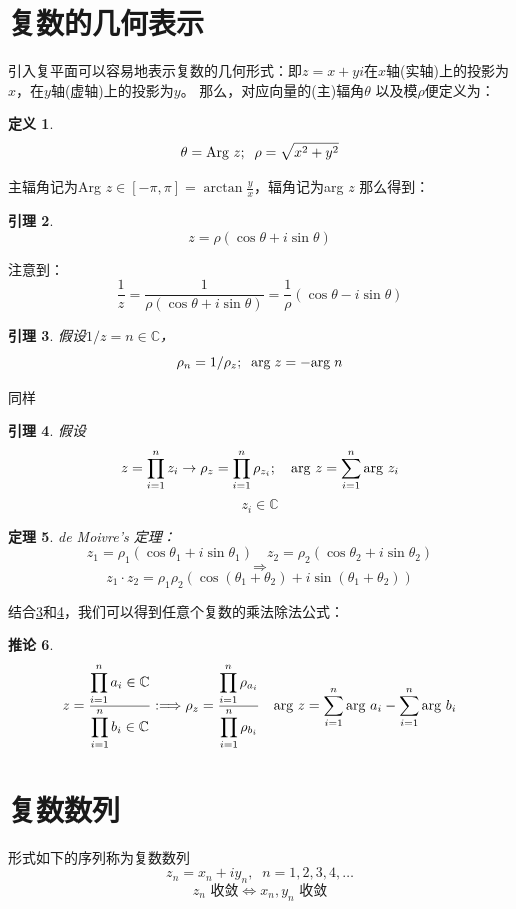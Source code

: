 \documentclass[10pt, a4paper, oneside]{ctexbook}
\newtheorem{theorem}{定理}[section]
\newtheorem{definition}[theorem]{定义}
\newtheorem{lemma}[theorem]{引理}
\newtheorem{corollary}[theorem]{推论}
\begin{document}
\section{复数的几何表示}
引入复平面可以容易地表示复数的几何形式：即$z=x+yi$在$x$轴(实轴)上的投影为$x$，在$y$轴(虚轴)上的投影为$y$。
那么，对应向量的(主)辐角$\theta$ 以及模$\rho$便定义为：
\begin{definition}
    $$\theta=\text{\rm Arg } z;\;\;\rho=\sqrt{x^2+y^2}$$
\end{definition}
主辐角记为Arg $\displaystyle z \in[-\pi,\pi] =\arctan \frac{y}{x}$，辐角记为arg $z$
那么得到：
\begin{lemma}
    \label{eularq}
    $$
        z = \rho(\cos \theta + i \sin \theta)
    $$
\end{lemma}
注意到：
$$
    \frac{1}{z}=\frac{1}{\rho(\cos \theta + i \sin \theta)}=\frac{1}{\rho}(\cos \theta - i \sin \theta)
$$
\begin{lemma}
    \label{le1}
    假设$1/z=n\in \mathbb{C}$，
    $$\rho_{n}=1/\rho_z;\;\; {\rm arg \;} z=-{\rm arg \;} n$$
\end{lemma}
同样
\begin{lemma}
    \label{le2}
    假设$$
        z=\prod_{i=1}^{n}z_i\to \rho_z=\prod_{i=1}^n \rho_{z_i};\quad \text{\rm arg }z=\sum_{i=1}^n \text{\rm arg }z_i
    $$
    $$z_i\in\mathbb{C}$$
\end{lemma}
\begin{theorem}
    de Moivre’s 定理：
    $$z_1=\rho_1(\cos\theta_1+i\sin \theta_1)\quad z_2=\rho_2(\cos\theta_2+i\sin \theta_2)$$
    $$\Rightarrow$$
    $$z_1\cdot z_2=\rho_1\rho_2(\cos(\theta_1+\theta_2)+i\sin(\theta_1+\theta_2))$$
\end{theorem}
结合\ref{le1}和\ref{le2}，我们可以得到任意个复数的乘法除法公式：
\begin{corollary}
    \begin{align*}
        z=\frac{\displaystyle\prod_{i=1}^n a_i \in \mathbb{C} }{\displaystyle\prod_{i=1}^n b_i \in \mathbb{C}}
        :\Longrightarrow \rho_z=\frac{\displaystyle\prod_{i=1}^n \rho_{a_i}}{\displaystyle\prod_{i=1}^n \rho_{b_i}} \quad \text{\rm arg }z =
        \sum_{i=1}^n \text{\rm arg }a_i - \sum_{i=1}^n \text{\rm arg }b_i
    \end{align*}
\end{corollary}
\section{复数数列}
形式如下的序列称为复数数列
$$
    z_n=x_n+i y_n , \; \; n=1,2,3,4,\dots
$$
$$z_n\text{ 收敛} \Leftrightarrow x_{n},y_{n} \text{ 收敛} $$
\end{document}
